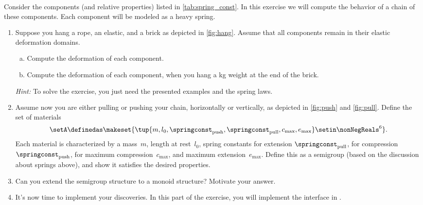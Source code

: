 \begin{gradedexercise}
    \label{ex:Goldberg}
    Consider the components (and relative properties) listed in \cref{tab:spring_const}.
    In this exercise we will compute the behavior of a chain of these components.
    Each component will be modeled as a heavy spring.
    \begin{enumerate}
        \item Suppose you hang a rope, an elastic, and a brick as depicted in \cref{fig:hang}.
              Assume that all components remain in their elastic deformation domains.
              \begin{enumerate}[(a)]
                  \item Compute the deformation of each component.
                  \item Compute the deformation of each component, when you hang a \unit[1]{kg} weight at the end of the brick.
              \end{enumerate}
              \emph{Hint:}
              To solve the exercise, you just need the presented examples and the spring laws.
        \item Assume now you are either pulling or pushing your chain, horizontally or vertically, as depicted in \cref{fig:push} and \cref{fig:pull}.
              Define the set of materials
              \begin{equation}
                  \setA\definedas \makeset{ \tup{m,l_0, \springconst_\mathrm{push},\springconst_\mathrm{pull}, c_\mathrm{max}, e_\mathrm{max}} \setin \nonNegReals^6}.
              \end{equation}
              Each material is characterized by a mass~$m$, length at rest~$l_0$, spring constants for extension $\springconst_\mathrm{pull}$, for compression~$\springconst_\mathrm{push}$, for maximum compression~$c_\mathrm{max}$, and maximum extension~$e_\mathrm{max}$.
              Define this as a semigroup (based on the discussion about springs above), and show it satisfies the desired properties.
        \item Can you extend the semigroup structure to a monoid structure?
              Motivate your answer.
        \item It's now time to implement your discoveries.
              In this part of the exercise, you will implement the interface in .


\end{enumerate}
\end{gradedexercise}
